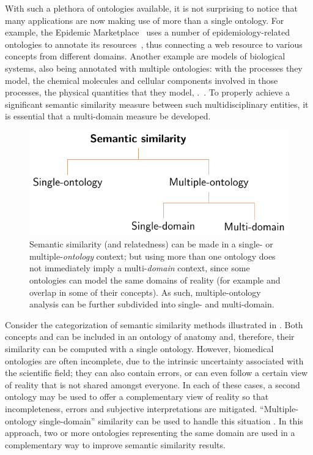 With such a plethora of ontologies available, it is not surprising to notice that many applications are now making use of more than a single ontology. For example, the Epidemic Marketplace~\citep{Lopes2010} uses a number of epidemiology-related ontologies to annotate its resources~\citep{Ferreira2012}, thus connecting a web resource to various concepts from different domains. Another example are models of biological systems, also being annotated with multiple ontologies: with the processes they model, the chemical molecules and cellular components involved in those processes, the physical quantities that they model, \etc.~\citep{Li2010a,Juty2015}. To properly achieve a significant semantic similarity measure between such multidisciplinary entities, it is essential that a multi-domain measure be developed.

\begin{figure}
    \centering
    \includegraphics{images/multi-domain-similarity-categories.pdf}
    \caption[Categories of semantic similarity]{Semantic similarity (and relatedness) can be made in a single- or multiple-\emph{ontology} context; but using more than one ontology does not immediately imply a multi-\emph{domain} context, since some ontologies can model the same domains of reality (for example  and  overlap in some of their concepts). As such, multiple-ontology analysis can be further subdivided into single- and multi-domain.}
    \label{fig:multi-domain-similarity}
\end{figure}

Consider the categorization of semantic similarity methods illustrated in . Both concepts  and  can be included in an ontology of anatomy and, therefore, their similarity can be computed with a single ontology. However, biomedical ontologies are often incomplete, due to the intrinsic uncertainty associated with the scientific field; they can also contain errors, or can even follow a certain view of reality that is not shared amongst everyone. In each of these cases, a second ontology may be used to offer a complementary view of reality so that incompleteness, errors and subjective interpretations are mitigated. ``Multiple-ontology single-domain'' similarity can be used to handle this situation \citep[\eg][]{Al-Mubaid2009}. In this approach, two or more ontologies representing the same domain are used in a complementary way to improve semantic similarity results.

